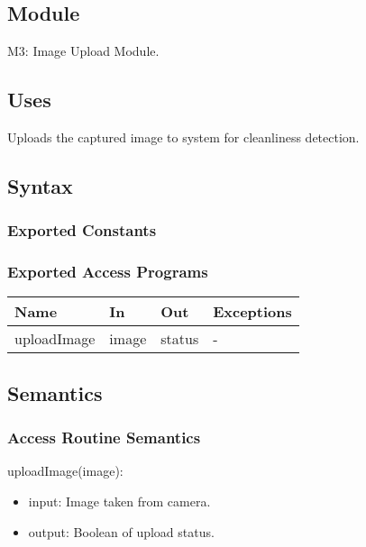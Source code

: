 \documentclass[12pt, titlepage]{article}
\begin{document}


\subsection{Module}

M3: Image Upload Module.

\subsection{Uses}
Uploads the captured image to system for cleanliness detection.

\subsection{Syntax}

\subsubsection{Exported Constants}

\subsubsection{Exported Access Programs}

\begin{center}
\begin{tabular}{p{2cm} p{4cm} p{4cm} p{2cm}}
\hline
\textbf{Name} & \textbf{In} & \textbf{Out} & \textbf{Exceptions} \\
\hline
uploadImage & image & status & - \\
\hline
\end{tabular}
\end{center}

\subsection{Semantics}


\subsubsection{Access Routine Semantics}

\noindent uploadImage(image):
\begin{itemize}
\item input: Image taken from camera. 
\item output: Boolean of upload status. 
\end{itemize}
\end{document}
